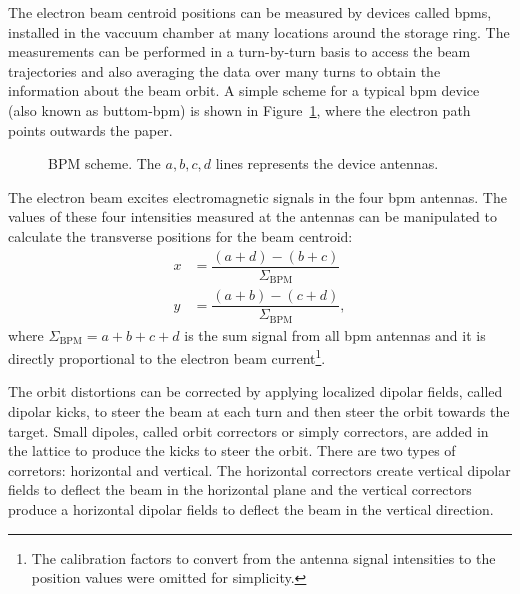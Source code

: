 The electron beam centroid positions can be measured by devices called \glspl{bpm}, installed in the vaccuum chamber at many locations around the storage ring. The measurements can be performed in a turn-by-turn basis to access the beam trajectories and also averaging the data over many turns to obtain the information about the beam orbit. A simple scheme for a typical \gls{bpm} device (also known as buttom-\gls{bpm}) is shown in Figure~\ref{fig:bpm_scheme}, where the electron path points outwards the paper.
\begin{figure}
    \centering
    \caption{BPM scheme. The $a, b, c, d$ lines represents the device antennas.}
    \label{fig:bpm_scheme}
\end{figure}

The electron beam excites electromagnetic signals in the four \gls{bpm} antennas. The values of these four intensities measured at the antennas can be manipulated to calculate the transverse positions for the beam centroid:
\begin{align}
    x &= \dfrac{\left(a + d\right) - \left(b + c\right)}{\Sigma_{\mathrm{BPM}}} \\
    y &= \dfrac{\left(a + b\right) - \left(c + d\right)}{\Sigma_{\mathrm{BPM}}},
\end{align}
where $\Sigma_{\mathrm{BPM}} = a + b + c + d$ is the sum signal from all \gls{bpm} antennas and it is directly proportional to the electron beam current\footnote{The calibration factors to convert from the antenna signal intensities to the position values were omitted for simplicity.}. 

The orbit distortions can be corrected by applying localized dipolar fields, called dipolar kicks, to steer the beam at each turn and then steer the orbit towards the target. Small dipoles, called orbit correctors or simply correctors, are added in the lattice to produce the kicks to steer the orbit. There are two types of corretors: horizontal and vertical. The horizontal correctors create vertical dipolar fields to deflect the beam in the horizontal plane and the vertical correctors produce a horizontal dipolar fields to deflect the beam in the vertical direction. 

